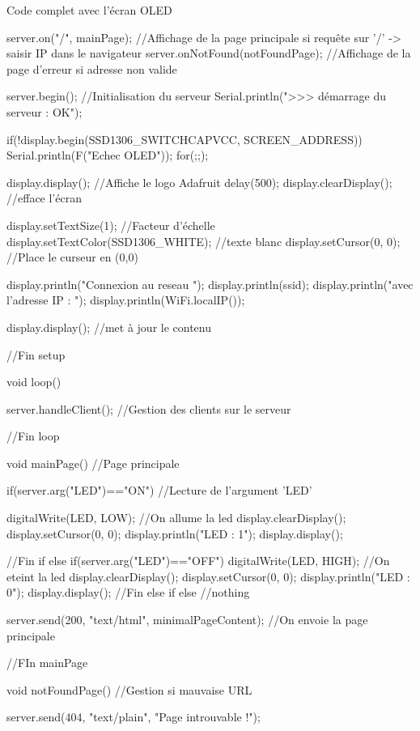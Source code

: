 \begin{Cpp}{Code complet avec l'écran OLED}
{      server.on("/", mainPage);           //Affichage de la page principale si requête sur '/' -> saisir IP dans le navigateur
      server.onNotFound(notFoundPage);    //Affichage de la page d'erreur si adresse non valide
    
      server.begin();                     //Initialisation du serveur
      Serial.println(">>> démarrage du serveur : OK");
    
      if(!display.begin(SSD1306_SWITCHCAPVCC, SCREEN_ADDRESS)) {
        Serial.println(F("Echec OLED"));
        for(;;); 
      }
    
      display.display(); //Affiche le logo Adafruit
      delay(500); 
      display.clearDisplay(); //efface l'écran
    
      display.setTextSize(1);               //Facteur d'échelle
      display.setTextColor(SSD1306_WHITE);  //texte blanc
      display.setCursor(0, 0);              //Place le curseur en (0,0)
      
      display.println("Connexion au reseau ");
      display.println(ssid);
      display.println("avec l'adresse IP : ");
      display.println(WiFi.localIP());
      
      display.display();   //met à jour le contenu
      
    }//Fin setup
    
    void loop() 
    {
      
      server.handleClient(); //Gestion des clients sur le serveur
      
    }//Fin loop
    
    
    void mainPage() //Page principale
    { 
    
     if(server.arg("LED")=="ON") //Lecture de l'argument 'LED'
     {
          digitalWrite(LED, LOW); //On allume la led
          display.clearDisplay();
          display.setCursor(0, 0);  
          display.println("LED : 1");
          display.display();
          
     }//Fin if
     else if(server.arg("LED")=="OFF")
     {
        digitalWrite(LED, HIGH);   //On eteint la led
        display.clearDisplay();
        display.setCursor(0, 0);  
        display.println("LED : 0");
        display.display();
     }//Fin else if
     else {
      //nothing
     }
    
     server.send(200, "text/html", minimalPageContent); //On envoie la page principale
      
    }//FIn mainPage
    
    
    void notFoundPage()  //Gestion si mauvaise URL
    {
      server.send(404, "text/plain", "Page introuvable !\n\n");
      
    }
    

\end{Cpp}%
